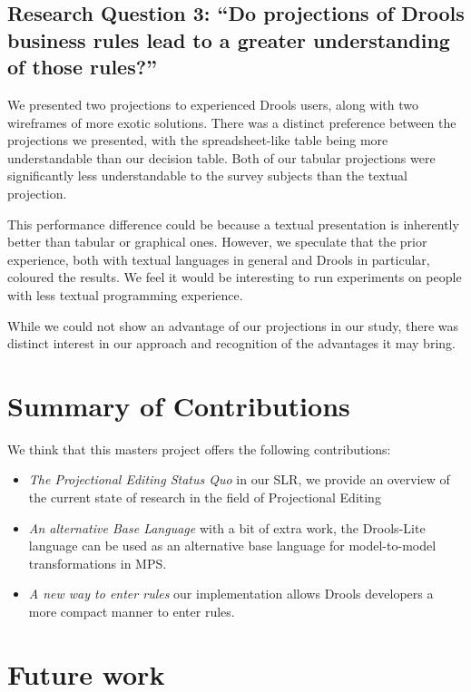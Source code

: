 \subsection{Research Question 3: ``Do projections of Drools business rules lead to a greater understanding of those rules?''}

We presented two projections to experienced Drools users, along with two wireframes of more exotic solutions.
There was a distinct preference between the projections we presented, with the spreadsheet-like table being more understandable than our decision table.
Both of our tabular projections were significantly less understandable to the survey subjects than the textual projection.

This performance difference could be because a textual presentation is inherently better than tabular or graphical ones.
However, we speculate that the prior experience, both with textual languages in general and Drools in particular, coloured the results.
We feel it would be interesting to run experiments on people with less textual programming experience.

While we could not show an advantage of our projections in our study, there was distinct interest in our approach and recognition of the advantages it may bring.

\section{Summary of Contributions}

We think that this masters project offers the following contributions:
\begin{itemize}
    \item \emph{The Projectional Editing Status Quo} in our SLR, we provide an overview of the current state of research in the field of Projectional Editing
    \item \emph{An alternative Base Language} with a bit of extra work, the Drools-Lite language can be used as an alternative base language for model-to-model transformations in MPS.
    \item \emph{A new way to enter rules} our implementation allows Drools developers a more compact manner to enter rules.
\end{itemize}

\section{Future work}

